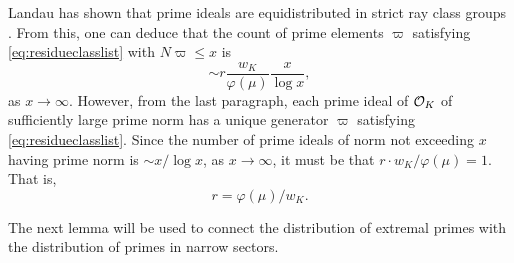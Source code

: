 \documentclass[12pt]{amsart}
\theoremstyle{remark}
\begin{document}
Landau has shown that prime ideals are equidistributed in strict ray class groups \cite{landau18}. From this, one can deduce that the count of prime elements $\varpi$ satisfying \eqref{eq:residueclasslist} with $N\varpi \le x$ is 
\[ \sim r \frac{w_K}{\varphi(\mu)} \frac{x}{\log{x}}, \] as $x\to\infty$. However, from the last paragraph, each prime ideal of $\mathcal{O}_K$ of sufficiently large prime norm has a unique generator $\varpi$ satisfying \eqref{eq:residueclasslist}. Since the number of prime ideals of norm not exceeding $x$ having prime norm is $\sim x/\log{x}$, as $x\to\infty$, it must be that $r \cdot w_K/\varphi(\mu)=1$. That is, \[ r=\varphi(\mu)/w_K. \]

The next lemma will be used to connect the distribution of extremal primes with the distribution of primes in narrow sectors.
\end{document}
